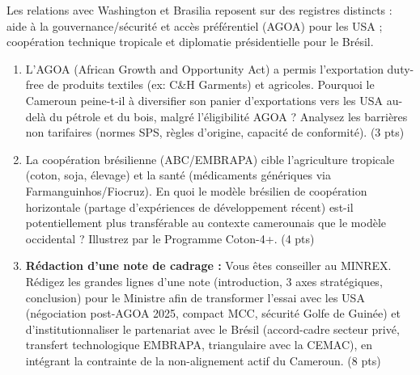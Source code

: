 \documentclass[11pt]{article}
\begin{document}
\begin{exercice}
Les relations avec Washington et Brasilia reposent sur des registres distincts : aide à la gouvernance/sécurité et accès préférentiel (AGOA) pour les USA ; coopération technique tropicale et diplomatie présidentielle pour le Brésil.
\begin{enumerate}
    \item L'AGOA (African Growth and Opportunity Act) a permis l'exportation duty-free de produits textiles (ex: C\&H Garments) et agricoles. Pourquoi le Cameroun peine-t-il à diversifier son panier d'exportations vers les USA au-delà du pétrole et du bois, malgré l'éligibilité AGOA ? Analysez les barrières non tarifaires (normes SPS, règles d'origine, capacité de conformité). (3 pts)
    \item La coopération brésilienne (ABC/EMBRAPA) cible l'agriculture tropicale (coton, soja, élevage) et la santé (médicaments génériques via Farmanguinhos/Fiocruz). En quoi le modèle brésilien de \og coopération horizontale \fg (partage d'expériences de développement récent) est-il potentiellement plus transférable au contexte camerounais que le modèle occidental ? Illustrez par le Programme Coton-4+. (4 pts)
    \item \textbf{Rédaction d'une note de cadrage :} Vous êtes conseiller au MINREX. Rédigez les grandes lignes d'une note (introduction, 3 axes stratégiques, conclusion) pour le Ministre afin de \og transformer l'essai \fg avec les USA (négociation post-AGOA 2025, compact MCC, sécurité Golfe de Guinée) et d'institutionnaliser le partenariat avec le Brésil (accord-cadre secteur privé, transfert technologique EMBRAPA, triangulaire avec la CEMAC), en intégrant la contrainte de la \og non-alignement actif \fg du Cameroun. (8 pts)
\end{enumerate}
\end{exercice}
\end{document}
